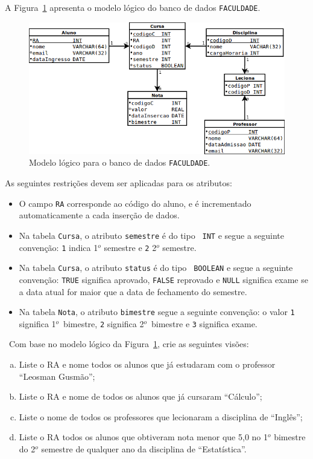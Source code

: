 A Figura~\ref{fig:faculdade} apresenta o modelo lógico do banco de 
dados {\tt FACULDADE}.

\begin{figure}[ht]
  \centering
  \includegraphics[scale=.6]{faculdade.png}
  \caption{Modelo lógico para o banco de dados {\tt FACULDADE}.}
  \label{fig:faculdade}
\end{figure}

As seguintes restrições devem ser aplicadas para os atributos:

\begin{itemize}

\item O campo {\tt RA} corresponde ao código do aluno, e é
  incrementado automaticamente a cada inserção de dados.
\item Na tabela {\tt Cursa}, o atributo {\tt semestre} é do tipo {\tt
    INT} e segue a seguinte convenção: {\tt 1} indica 1$^o$ semestre e
  {\tt 2} 2$^o$ semestre.
\item Na tabela {\tt Cursa}, o atributo {\tt status} é do tipo {\tt
    BOOLEAN} e segue a seguinte convenção: {\tt TRUE} significa
  aprovado, {\tt FALSE} reprovado e {\tt NULL} significa exame se a
  data atual for maior que a data de fechamento do semestre.  
\item Na tabela {\tt Nota}, o atributo {\tt bimestre} segue a seguinte
  convenção: o valor {\tt 1} significa 1$^o$~bimestre, {\tt 2}
  significa 2$^o$~bimestre e {\tt 3} significa exame.
\end{itemize}


~Com base no modelo lógico da Figura~\ref{fig:faculdade},
crie as seguintes visões:

\begin{enumerate}[a)]
\item Liste o RA e nome todos os alunos que já estudaram com o
  professor ``Leosman Gusmão''; 
\item  Liste o RA e nome de todos os alunos que já cursaram ``Cálculo''; 
\item  Liste o nome de todos os professores que lecionaram a disciplina de
  ``Inglês''; 
\item  Liste o RA todos os alunos que obtiveram nota menor que 5,0 no
  1$^o$ bimestre do 2$^o$ semestre de qualquer ano da disciplina de
  ``Estatística''. 
\end{enumerate}
